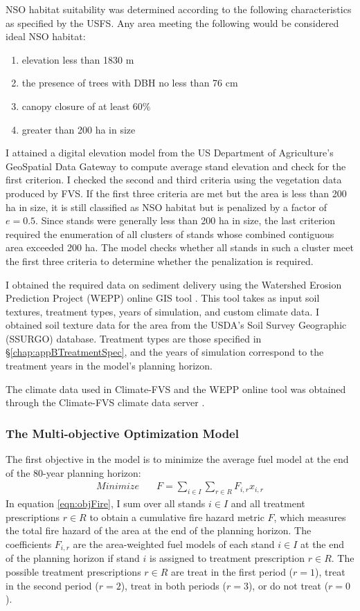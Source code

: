 NSO habitat suitability was determined according to the following characteristics as specified by the USFS. Any area meeting the following would be considered ideal NSO habitat:
\begin{enumerate}
\item elevation less than 1830 m
\item the presence of trees with DBH no less than 76 cm
\item canopy closure of at least 60\%
\item greater than 200 ha in size
\end{enumerate}
I attained a digital elevation model from the US Department of Agriculture's GeoSpatial Data Gateway to compute average stand elevation and check for the first criterion. I checked the second and third criteria using the vegetation data produced by FVS. If the first three criteria are met but the area is less than 200 ha in size, it is still classified as NSO habitat but is penalized by a factor of $e = 0.5$. Since stands were generally less than 200 ha in size, the last criterion required the enumeration of all clusters of stands whose combined contiguous area exceeded 200 ha. The model checks whether all stands in such a cluster meet the first three criteria to determine whether the penalization is required.

I obtained the required data on sediment delivery using the Watershed Erosion Prediction Project (WEPP) online GIS tool \cite{frankenberger2011development}. This tool takes as input soil textures, treatment types, years of simulation, and custom climate data. I obtained soil texture data for the area from the USDA's Soil Survey Geographic (SSURGO) database. Treatment types are those specified in \S \ref{chap:appBTreatmentSpec}, and the years of simulation correspond to the treatment years in the model's planning horizon.

The climate data used in Climate-FVS and the WEPP online tool was obtained through the Climate-FVS climate data server \cite{climateFVSReadyData}.

\subsubsection{The Multi-objective Optimization Model}
The first objective in the model is to minimize the average fuel model at the end of the 80-year planning horizon:
\begin{align}
Minimize \quad & F = \sum_{i\in I} \sum_{r\in R} F_{i,r} x_{i,r} \label{eqn:objFire}
\end{align}
In equation \eqref{eqn:objFire}, I sum over all stands $i \in I$ and all treatment prescriptions $r \in R$ to obtain a cumulative fire hazard metric $F$, which measures the total fire hazard of the area at the end of the planning horizon. The coefficients $F_{i,r}$ are the area-weighted fuel models of each stand $i \in I$ at the end of the planning horizon if stand $i$ is assigned to treatment prescription $r \in R$. The possible treatment prescriptions $r \in R$ are treat in the first period ($r=1$), treat in the second period ($r=2$), treat in both periods ($r=3$), or do not treat ($r=0$).

